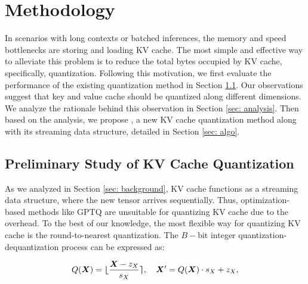 \section{Methodology}


In scenarios with long contexts or batched inferences, the memory and speed bottlenecks are storing and loading KV cache.
The most simple and effective way to alleviate this problem is to reduce the total bytes occupied by KV cache, specifically, quantization.
Following this motivation, we first evaluate the performance of the existing quantization method in Section \ref{sec: quant prelim}.
Our observations suggest that key and value cache should be quantized along different dimensions. We analyze the rationale behind this observation in Section \ref{sec: analysis}.
Then based on the analysis, we propose \kivi{}, a new KV cache quantization method along with its streaming data structure, detailed in Section \ref{sec: algo}.


\subsection{Preliminary Study of KV Cache Quantization}
\label{sec: quant prelim}


As we analyzed in Section \ref{sec: background}, KV cache functions as a streaming data structure, where the new tensor arrives sequentially.
Thus, optimization-based methods like GPTQ \citep{gptq} are unsuitable for quantizing KV cache due to the overhead.
To the best of our knowledge, the most flexible way for quantizing KV cache is the round-to-nearest quantization.
The $B-$bit integer quantization-dequantization process can be expressed as:

\vspace{-2em}
\begin{equation}
    Q({\bm{X}}) = \bm\lfloor \frac{{\bm{X}} - z_X}{s_X} \bm\rceil, ~~~
    {\bm{X}}' = Q({\bm{X}}) \cdot s_X + z_X,  \nonumber
\end{equation}
\vspace{-2em}

